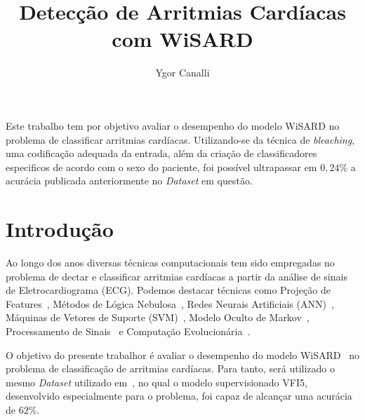 \documentclass[12pt]{article}
\title{Detecção de Arritmias Cardíacas com WiSARD}
\author{Ygor Canalli\inst{1}}
\begin{document}
 

\maketitle

     
\begin{resumo} 
  Este trabalho tem por objetivo avaliar o desempenho do modelo WiSARD no problema de classificar arritmias cardíacas. Utilizando-se da técnica de \emph{bleaching}, uma codificação adequada da entrada, além da criação de classificadores especificos de acordo com o sexo do paciente, foi possível ultrapassar em $0,24\%$ a acurácia publicada anteriormente no \emph{Dataset} em questão.
\end{resumo}


\section{Introdução}

Ao longo dos anos diversas técnicas computacionais tem sido empregadas no problema de dectar e classificar arritmias cardíacas a partir da análise de sinais de Eletrocardiograma (ECG). Podemos destacar técnicas como Projeção de Features~\cite{guvenir1997supervised}, Métodos de Lógica Nebulosa~\cite{salem2009machine, Ijaecs110}, Redes Neurais Artificiais (ANN)~\cite{salem2009machine, Ijaecs110}, Máquinas de Vetores de Suporte (SVM)~\cite{salem2009machine, Ijaecs110}, Modelo Oculto de Markov~\cite{salem2009machine}, Processamento de Sinais~\cite{Ijaecs110} e Computação Evolucionária~\cite{Ijaecs110, martin2014cardiac}.

O objetivo do presente trabalhor é avaliar o desempenho do modelo WiSARD~\cite{aleksander1984wisard} no problema de classificação de arritmias cardíacas. Para tanto, será utilizado o mesmo \emph{Dataset} utilizado em~\cite{guvenir1997supervised}, no qual o modelo supervisionado VFI5, desenvolvido especialmente para o problema, foi capaz de alcançar uma acurácia de $62\%$.
\end{document}
